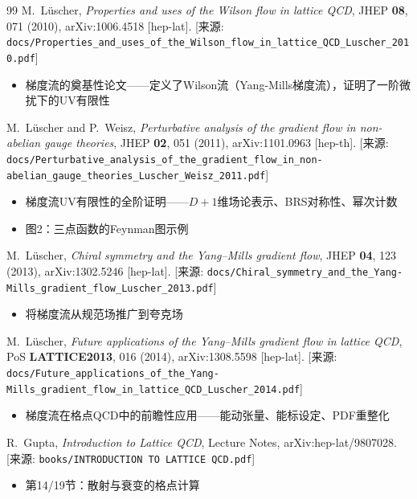 \documentclass[12pt,a4paper]{ctexart}
\theoremstyle{definition}
\begin{document}
\begin{thebibliography}{99}
M.~L\"uscher,
\textit{Properties and uses of the Wilson flow in lattice QCD},
JHEP \textbf{08}, 071 (2010), arXiv:1006.4518 [hep-lat].
[来源: \texttt{docs/Properties\_and\_uses\_of\_the\_Wilson\_flow\_in\_lattice\_QCD\_Luscher\_2010.pdf}]
\begin{itemize}
    \item 梯度流的奠基性论文——定义了Wilson流（Yang-Mills梯度流），证明了一阶微扰下的UV有限性
\end{itemize}

M.~L\"uscher and P.~Weisz,
\textit{Perturbative analysis of the gradient flow in non-abelian gauge theories},
JHEP \textbf{02}, 051 (2011), arXiv:1101.0963 [hep-th].
[来源: \texttt{docs/Perturbative\_analysis\_of\_the\_gradient\_flow\_in\_non-abelian\_gauge\_theories\_Luscher\_Weisz\_2011.pdf}]
\begin{itemize}
    \item 梯度流UV有限性的全阶证明——$D+1$维场论表示、BRS对称性、幂次计数
    \item 图2：三点函数的Feynman图示例
\end{itemize}

M.~L\"uscher,
\textit{Chiral symmetry and the Yang--Mills gradient flow},
JHEP \textbf{04}, 123 (2013), arXiv:1302.5246 [hep-lat].
[来源: \texttt{docs/Chiral\_symmetry\_and\_the\_Yang-Mills\_gradient\_flow\_Luscher\_2013.pdf}]
\begin{itemize}
    \item 将梯度流从规范场推广到夸克场
\end{itemize}

M.~L\"uscher,
\textit{Future applications of the Yang--Mills gradient flow in lattice QCD},
PoS \textbf{LATTICE2013}, 016 (2014), arXiv:1308.5598 [hep-lat].
[来源: \texttt{docs/Future\_applications\_of\_the\_Yang-Mills\_gradient\_flow\_in\_lattice\_QCD\_Luscher\_2014.pdf}]
\begin{itemize}
    \item 梯度流在格点QCD中的前瞻性应用——能动张量、能标设定、PDF重整化
\end{itemize}

R.~Gupta,
\textit{Introduction to Lattice QCD},
Lecture Notes, arXiv:hep-lat/9807028.
[来源: \texttt{books/INTRODUCTION TO LATTICE QCD.pdf}]
\begin{itemize}
    \item 第14/19节：散射与衰变的格点计算
\end{itemize}


\end{thebibliography}
\end{document}
